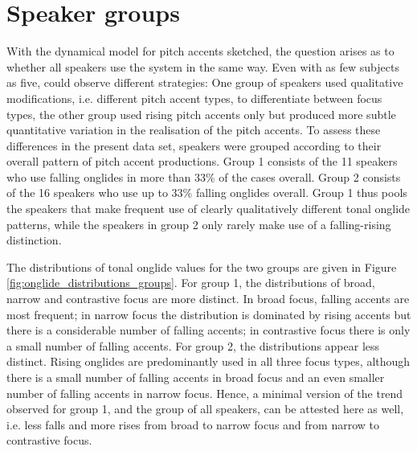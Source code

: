 \section{Speaker groups}

With the dynamical model for pitch accents sketched, the question arises as to whether all speakers use the system in the same way. Even with as few subjects as five, \citet{Griceetal2017} could observe different strategies: One group of speakers used qualitative modifications, i.e. different pitch accent types, to differentiate between focus types, the other group used rising pitch accents only but produced more subtle quantitative variation in the realisation of the pitch accents. To assess these differences in the present data set, speakers were grouped according to their overall pattern of pitch accent productions. Group 1 consists of the 11 speakers who use falling onglides in more than 33\% of the cases overall. Group 2 consists of the 16 speakers who use up to 33\% falling onglides overall. Group 1 thus pools the speakers that make frequent use of clearly qualitatively different tonal onglide patterns, while the speakers in group 2 only rarely make use of a falling-rising distinction. 

The distributions of tonal onglide values for the two groups are given in Figure \ref{fig:onglide_distributions_groups}. For group 1, the distributions of broad, narrow and contrastive focus are more distinct. In broad focus, falling accents are most frequent; in narrow focus the distribution is dominated by rising accents but there is a considerable number of falling accents; in contrastive focus there is only a small number of falling accents. For group 2, the distributions appear less distinct. Rising onglides are predominantly used in all three focus types, although there is a small number of falling accents in broad focus and an even smaller number of falling accents in narrow focus. Hence, a minimal version of the trend observed for group 1, and the group of all speakers, can be attested here as well, i.e. less falls and more rises from broad to narrow focus and from narrow to contrastive focus.

